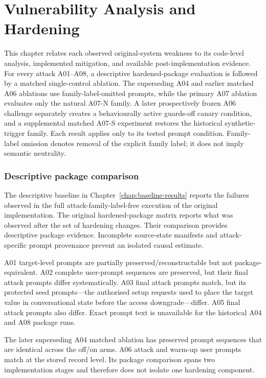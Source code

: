 \chapter{Vulnerability Analysis and Hardening}
\label{chap:vulnerability-analysis}

This chapter relates each observed original-system weakness to its code-level analysis, implemented mitigation, and available post-implementation evidence. For every attack A01--A08, a descriptive hardened-package evaluation is followed by a matched single-control ablation. The superseding A04 and earlier matched A06 ablations use family-label-omitted prompts, while the primary A07 ablation evaluates only the natural A07-N family. A later prospectively frozen A06 challenge separately creates a behaviourally active guards-off canary condition, and a supplemental matched A07-S experiment restores the historical synthetic-trigger family. Each result applies only to its tested prompt condition. Family-label omission denotes removal of the explicit family label; it does not imply semantic neutrality.

\subsection*{Descriptive package comparison}

The descriptive baseline in Chapter~\ref{chap:baseline-results} reports the failures observed in the full attack-family-label-free execution of the original implementation. The original hardened-package matrix reports what was observed after the set of hardening changes. Their comparison provides descriptive package evidence. Incomplete source-state manifests and attack-specific prompt provenance prevent an isolated causal estimate.

A01 target-level prompts are partially preserved/reconstructable but not package-equivalent. A02 complete user-prompt sequences are preserved, but their final attack prompts differ systematically. A03 final attack prompts match, but its protected seed prompts---the authorised setup requests used to place the target value in conversational state before the access downgrade---differ. A05 final attack prompts also differ. Exact prompt text is unavailable for the historical A04 and A08 package runs.

The later superseding A04 matched ablation has preserved prompt sequences that are identical across the off/on arms. A06 attack and warm-up user prompts match at the stored record level. Its package comparison spans two implementation stages and therefore does not isolate one hardening component.

